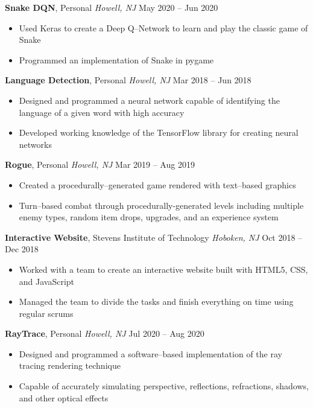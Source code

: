 \documentclass[10pt,letterpaper,roman]{moderncv}
\begin{document}
\hfill

\textbf{Snake DQN}, Personal \textit{Howell, NJ} \hfill May 2020 -- Jun 2020
\begin{itemize}
	\item Used Keras to create a Deep Q--Network to learn and play the classic game of Snake
	\item Programmed an implementation of Snake in pygame
\end{itemize}

\hfill

\textbf{Language Detection}, Personal \textit{Howell, NJ} \hfill Mar 2018 -- Jun 2018
\begin{itemize}
	\item Designed and programmed a neural network capable of identifying the language of a given word with high accuracy
	\item Developed working knowledge of the TensorFlow library for creating neural networks
\end{itemize}

\hfill

\textbf{Rogue}, Personal \textit{Howell, NJ} \hfill Mar 2019 -- Aug 2019
\begin{itemize}
	\item Created a procedurally--generated game rendered with text--based graphics
	\item Turn--based combat through procedurally-generated levels including multiple enemy types, random item drops, upgrades, and an experience system
\end{itemize}

\hfill

\textbf{Interactive Website}, Stevens Institute of Technology \textit{Hoboken, NJ} \hfill Oct 2018 -- Dec 2018
\begin{itemize}
	\item Worked with a team to create an interactive website built with HTML5, CSS, and JavaScript
	\item Managed the team to divide the tasks and finish everything on time using regular scrums
\end{itemize}

\hfill

\textbf{RayTrace}, Personal \textit{Howell, NJ} \hfill Jul 2020 -- Aug 2020
\begin{itemize}
	\item Designed and programmed a software--based implementation of the ray tracing rendering technique
	\item Capable of accurately simulating perspective, reflections, refractions, shadows, and other optical effects
\end{itemize}
\end{document}

